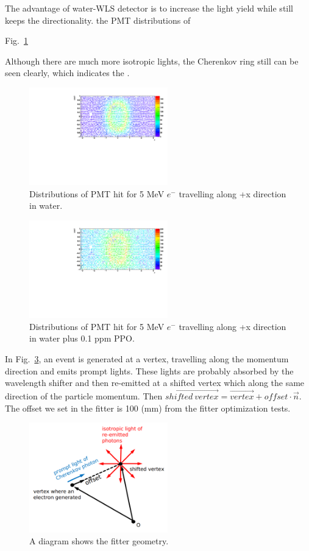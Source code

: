 \documentclass[preprint,12pt]{elsarticle}
\begin{document}
The advantage of water-WLS detector is to increase the light yield while still keeps the directionality. the PMT distributions of 

Fig.~\ref{PMT_5MeV_water}

Although there are much more isotropic lights, the Cherenkov ring still can be seen clearly, which indicates the .

\begin{figure}[htbp]
	\centering	
	\includegraphics[width=6cm]{PMT_5MeVElectronWater.pdf}
	\caption{\label{PMT_5MeV_water} 
		Distributions of PMT hit for 5 MeV $e^-$ travelling along +x direction in water.
	}
\end{figure}

\begin{figure}[htbp]
	\centering	
	\includegraphics[width=6cm]{PMT_5MeVElectron0p1ppmPPO.pdf}
	\caption{\label{PMT_5MeV_0p1ppmPPO} 
	Distributions of PMT hit for 5 MeV $e^-$ travelling along +x direction in water plus 0.1 ppm PPO.
	}
\end{figure}



In Fig.~\ref{FitterDiagram}, an event is generated at a vertex, travelling along the momentum direction and emits prompt lights. These lights are probably absorbed by the wavelength shifter and then re-emitted at a shifted vertex which along the same direction of the particle momentum. Then $\overrightarrow{shifted~vertex}=\overrightarrow{vertex}+offset\cdot \vec{n}$.  
The offset we set in the fitter is 100 (mm) from the fitter optimization tests. 

\begin{figure}[htbp]
	\centering	
	\includegraphics[width=6cm]{FitterDiagram.pdf}
	\caption{\label{FitterDiagram} 
		A diagram shows the fitter geometry.
	}
\end{figure}
\end{document}
